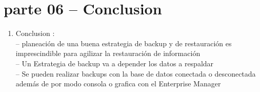 \section{parte 06 – Conclusion} 

\begin{enumerate}[1.]
	\item Conclusion :
	\\-- planeación de una buena estrategia de backup y de restauración es imprescindible para agilizar la restauración de información
	\\-- Un Estrategia de backup va a depender los datos a respaldar
	\\-- Se pueden realizar backups con la base de datos conectada o desconectada además de por modo consola o grafica con el Enterprise Manager

	


	
	

\end{enumerate} 
